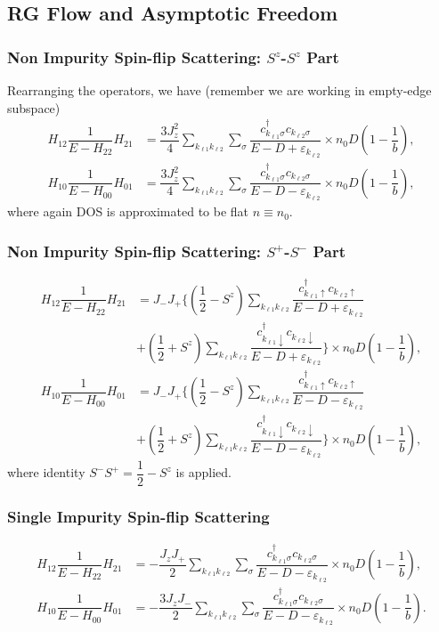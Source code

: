 \documentclass[10pt,aspectratio=43,xcolor=x11names]{beamer}%
\begin{document}
	\subsection{RG Flow and Asymptotic Freedom}
		\begin{frame}\frametitle{Non Impurity Spin-flip Scattering: $S^z$-$S^z$ Part}
			Rearranging the operators, we have (remember we are working in empty-edge subspace)
			\begin{align*}
				H_{12}\dfrac{1}{E-H_{22}}H_{21}&=\dfrac{3J_z^2}{4}\sum_{k_{\ell1}k_{\ell2}}\sum_\sigma \dfrac{c_{k_{\ell1}\sigma}^\dagger c_{k_{\ell2}\sigma}}{E-D+\varepsilon_{k_{\ell2}}}\times n_0D\left(1-\dfrac{1}{b}\right),\\
				H_{10}\dfrac{1}{E-H_{00}}H_{01}&=\dfrac{3J_z^2}{4}\sum_{k_{\ell1}k_{\ell2}}\sum_\sigma\dfrac{c_{k_{\ell1}\sigma}^\dagger c_{k_{\ell2}\sigma}}{E-D-\varepsilon_{k_{\ell2}}}\times n_0D\left(1-\dfrac{1}{b}\right),
			\end{align*}
			where again DOS is approximated to be flat $n\equiv n_0$.
		\end{frame}
		\begin{frame}\frametitle{Non Impurity Spin-flip Scattering: $S^+$-$S^-$ Part}
			\begin{align*}
				H_{12}\dfrac{1}{E-H_{22}}H_{21}&=J_-J_+\bigg\{\left(\dfrac{1}{2}-S^z\right)\sum_{k_{\ell1}k_{\ell2}}\dfrac{c_{k_{\ell1}\uparrow}^\dagger  c_{k_{\ell2}\uparrow}}{E-D+\varepsilon_{k_{\ell2}}}\\
				&+\left(\dfrac{1}{2}+S^z\right)\sum_{k_{\ell1}k_{\ell2}}\dfrac{c_{k_{\ell1}\downarrow}^\dagger c_{k_{\ell2}\downarrow}}{E-D+\varepsilon_{k_{\ell2}}}\bigg\}\times n_0D\left(1-\dfrac{1}{b}\right),\\
				H_{10}\dfrac{1}{E-H_{00}}H_{01}&=J_-J_+\bigg\{\left(\dfrac{1}{2}-S^z\right)\sum_{k_{\ell1}k_{\ell2}}\dfrac{c_{k_{\ell1}\uparrow}^\dagger  c_{k_{\ell2}\uparrow}}{E-D-\varepsilon_{k_{\ell2}}}\\
				&+\left(\dfrac{1}{2}+S^z\right)\sum_{k_{\ell1}k_{\ell2}}\dfrac{c_{k_{\ell1}\downarrow}^\dagger c_{k_{\ell2}\downarrow}}{E-D-\varepsilon_{k_{\ell2}}}\bigg\}\times n_0D\left(1-\dfrac{1}{b}\right),
			\end{align*}
			where identity $S^-S^+=\dfrac{1}{2}-S^z$ is applied.
		\end{frame}
		\begin{frame}\frametitle{Single Impurity Spin-flip Scattering}
			\begin{align*}
				H_{12}\dfrac{1}{E-H_{22}}H_{21}&=-\dfrac{J_z J_+}{2}\sum_{k_{\ell1}k_{\ell2}}\sum_\sigma\dfrac{c_{k_{\ell1}\sigma}^\dagger c_{k_{\ell2}\sigma}}{E-D-\varepsilon_{k_{\ell2}}}\times n_0D\left(1-\dfrac{1}{b}\right),\\
				H_{10}\dfrac{1}{E-H_{00}}H_{01}&=-\dfrac{3J_z J_-}{2}\sum_{k_{\ell1}k_{\ell2}}\sum_\sigma\dfrac{c_{k_{\ell1}\sigma}^\dagger c_{k_{\ell2}\sigma}}{E-D-\varepsilon_{k_{\ell2}}}\times n_0D\left(1-\dfrac{1}{b}\right).
			\end{align*}
		\end{frame}
\end{document}
